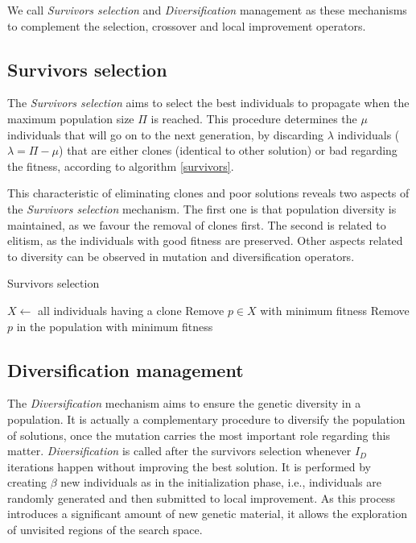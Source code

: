 We call \textit{Survivors selection} and \textit{Diversification} management as these mechanisms to complement the selection, crossover and local improvement operators.

\subsection{Survivors selection}
\label{subsec:survivors}
The \textit{Survivors selection} aims to select the best individuals to propagate when the maximum population size $\Pi$ is reached. This procedure determines the $\mu$ individuals that will go on to the next generation, by discarding $\lambda$ individuals ($\lambda = \Pi - \mu$) that are either clones (identical to other solution) or bad regarding the fitness, according to algorithm \ref{survivors}.

This characteristic of eliminating clones and poor solutions reveals two aspects of the \textit{Survivors selection} mechanism. The first one is that population diversity is maintained, as we favour the removal of clones first. The second is related to elitism, as the individuals with good fitness are preserved. Other aspects related to diversity can be observed in mutation and diversification operators.

\begin{algorithm}[H]
\caption{Survivors selection}
\label{survivors}
\begin{algorithmic}[1]
\STATE $X \leftarrow $ all individuals having a clone
\STATE Remove $p \in X$ with minimum fitness
\ELSE
\STATE Remove $p$ in the population with minimum fitness
\ENDIF
\ENDFOR
\end{algorithmic}
\end{algorithm}

\subsection{Diversification management}
\label{subsec:diversification}
The \textit{Diversification} mechanism aims to ensure the genetic diversity in a population. It is actually a complementary procedure to diversify the population of solutions, once the mutation carries the most important role regarding this matter. \textit{Diversification} is called after the survivors selection whenever $I_D$ iterations happen without improving the best solution. It is performed by creating $\beta$ new individuals as in the initialization phase, i.e., individuals are randomly generated and then submitted to local improvement. As this process introduces a significant amount of new genetic material, it allows the exploration of unvisited regions of the search space.

